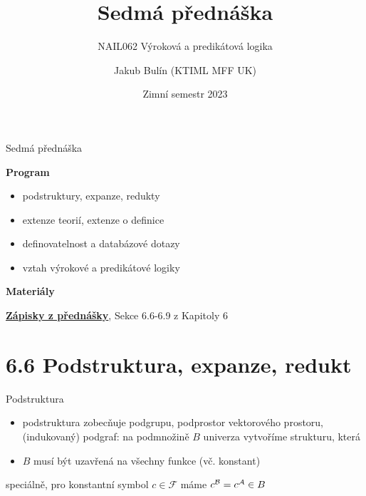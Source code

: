 \documentclass{beamer}
\title{Sedmá přednáška}
\subtitle{NAIL062 Výroková a predikátová logika}
\author{Jakub Bulín (KTIML MFF UK)}
\date{Zimní semestr 2023}
\begin{document}
\frame{\titlepage}


\begin{frame}{Sedmá přednáška}

    \textbf{Program}
        \begin{itemize}
            \item podstruktury, expanze, redukty           
            \item extenze teorií, extenze o definice
            \item definovatelnost a databázové dotazy
            \item vztah výrokové a predikátové logiky
        \end{itemize}

    \textbf{Materiály}

        \href{https://github.com/jbulin-mff-uk/nail062/raw/main/lecture/lecture-notes/lecture-notes.pdf}{\alert{\textbf{Zápisky z přednášky}}}, Sekce 6.6-6.9 z Kapitoly 6

\end{frame}


\section{6.6 Podstruktura, expanze, redukt}


\begin{frame}{Podstruktura}

    \begin{itemize}
        \item \alert{podstruktura} zobecňuje podgrupu, podprostor vektorového prostoru, (indukovaný) podgraf: na podmnožině $B$ univerza vytvoříme strukturu, která 
        \item $B$ musí být \alert{uzavřená} na všechny funkce (vč. konstant)
    \end{itemize}


    speciálně, pro konstantní symbol $c\in\mathcal F$ máme $c^{\mathcal{B}}=c^{\mathcal{A}}\in B$
    


\end{frame}
\end{document}
